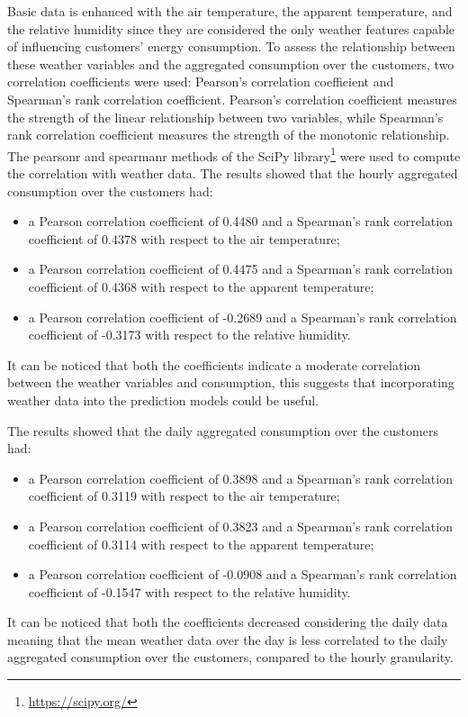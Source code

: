 Basic data is enhanced with the air temperature, the apparent temperature, and the relative humidity since they are considered the only weather features capable of influencing customers' energy consumption.
To assess the relationship between these weather variables and the aggregated consumption over the customers, two correlation coefficients were used: Pearson's correlation coefficient and Spearman's rank correlation coefficient.
Pearson's correlation coefficient measures the strength of the linear relationship between two variables, while Spearman's rank correlation coefficient measures the strength of the monotonic relationship.
The pearsonr and spearmanr methods of the SciPy library\footnote{ \url{https://scipy.org/} } were used to compute the correlation with weather data.
The results showed that the hourly aggregated consumption over the customers had:
\begin{itemize}
  \item a Pearson correlation coefficient of 0.4480 and a Spearman's rank correlation coefficient of 0.4378 with respect to the air temperature;
  \item a Pearson correlation coefficient of 0.4475 and a Spearman's rank correlation coefficient of 0.4368 with respect to the apparent temperature;
  \item a Pearson correlation coefficient of -0.2689 and a Spearman's rank correlation coefficient of -0.3173 with respect to the relative humidity.
\end{itemize}
It can be noticed that both the coefficients indicate a moderate correlation between the weather variables and consumption, this suggests that incorporating weather data into the prediction models could be useful.

The results showed that the daily aggregated consumption over the customers had:
\begin{itemize}
  \item a Pearson correlation coefficient of 0.3898 and a Spearman's rank correlation coefficient of 0.3119 with respect to the air temperature;
  \item a Pearson correlation coefficient of 0.3823 and a Spearman's rank correlation coefficient of 0.3114 with respect to the apparent temperature;
  \item a Pearson correlation coefficient of -0.0908 and a Spearman's rank correlation coefficient of -0.1547 with respect to the relative humidity.
\end{itemize}
It can be noticed that both the coefficients decreased considering the daily data meaning that the mean weather data over the day is less correlated to the daily aggregated consumption over the customers, compared to the hourly granularity.

